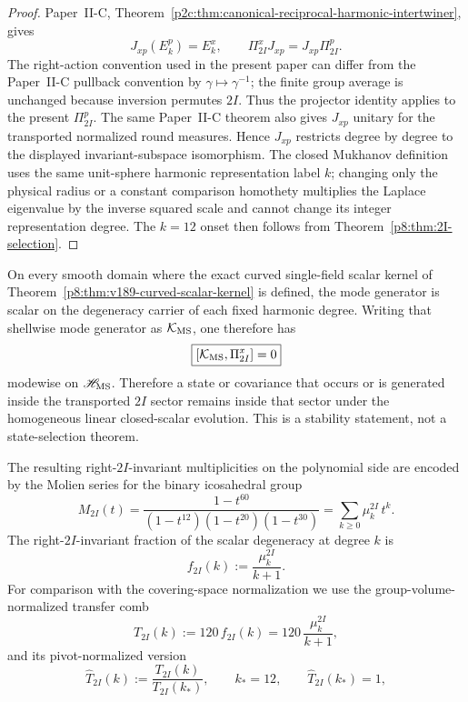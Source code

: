 \documentclass[12pt,a4paper]{article}
\begin{document}
\begin{proof}
Paper~II-C, Theorem~\ref{p2c:thm:canonical-reciprocal-harmonic-intertwiner},
gives
\[
 J_{xp}(E_k^p)=E_k^x,
 \qquad
 \Pi_{2I}^xJ_{xp}=J_{xp}\Pi_{2I}^p.
\]
The right-action convention used in the present paper can differ from the
Paper~II-C pullback convention by $\gamma\mapsto\gamma^{-1}$; the finite
group average is unchanged because inversion permutes $2I$.  Thus the
projector identity applies to the present $\Pi_{2I}^p$.  The same Paper~II-C
theorem also gives $J_{xp}$ unitary for the transported normalized round
measures.  Hence
$J_{xp}$ restricts degree by degree to the displayed invariant-subspace
isomorphism.  The closed Mukhanov definition uses the same unit-sphere
harmonic representation label $k$; changing only the physical radius or a
constant comparison homothety multiplies the Laplace eigenvalue by the
inverse squared scale and cannot change its integer representation degree.
The $k=12$ onset then follows from Theorem~\ref{p8:thm:2I-selection}.
\end{proof}

\begin{corollary}
\label{p8:cor:g30a-2i-dynamical-invariance}
On every smooth domain where the exact curved single-field scalar kernel of
Theorem~\ref{p8:thm:v189-curved-scalar-kernel} is defined, the mode generator
is scalar on the degeneracy carrier of each fixed harmonic degree.  Writing
that shellwise mode generator as $\mathcal K_{\rm MS}$, one therefore has
\[
 \boxed{[\mathcal K_{\rm MS},\Pi_{2I}^x]=0}
\]
modewise on $\mathscr H_{\rm MS}$.  Therefore a state or covariance that occurs or is generated
inside the transported $2I$ sector remains inside
that sector under the homogeneous linear closed-scalar evolution.  This is a
stability statement, not a state-selection theorem.
\end{corollary}

The resulting right-\(2I\)-invariant multiplicities on the polynomial side are
encoded by the Molien series for the binary icosahedral group
\begin{equation}
\label{p8:eq:2I-molien}
M_{2I}(t)
=
\frac{1-t^{60}}{(1-t^{12})(1-t^{20})(1-t^{30})}
=
\sum_{k\ge0} \mu_k^{2I}\,t^k.
\end{equation}
The right-\(2I\)-invariant fraction of the scalar degeneracy at degree \(k\) is
\[
f_{2I}(k):=\frac{\mu_k^{2I}}{k+1}.
\]
For comparison with the covering-space normalization we use the group-volume-normalized transfer comb
\begin{equation}
\label{p8:eq:2I-transfer}
T_{2I}(k):=
120\,f_{2I}(k)=120\,\frac{\mu_k^{2I}}{k+1},
\end{equation}
and its pivot-normalized version
\begin{equation}
\label{p8:eq:2I-transfer-hat}
\widehat T_{2I}(k):=\frac{T_{2I}(k)}{T_{2I}(k_*)},
\qquad k_*=12,\qquad \widehat T_{2I}(k_*)=1,
\end{equation}
\end{document}
